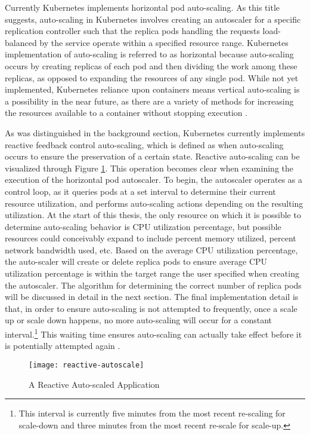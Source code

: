 Currently Kubernetes implements horizontal pod auto-scaling.
As this title suggests, auto-scaling in
Kubernetes involves creating an autoscaler for a specific replication
controller such that the replica pods handling the requests load-balanced by the service
operate within a specified resource range. Kubernetes
implementation of auto-scaling is referred to as horizontal because
auto-scaling occurs by creating replicas of each pod and then dividing the work
among these replicas, as opposed to expanding the resources of any single pod.
While not yet implemented, Kubernetes reliance upon containers means vertical
auto-scaling is a possibility in the near future, as there are a variety of
methods for increasing the resources available to a container without stopping
execution \cite{docker-up-and-running}.

As was distinguished in the background section, Kubernetes currently implements reactive
feedback control auto-scaling, which is defined as when auto-scaling occurs to
ensure the preservation of a certain state. Reactive auto-scaling can be
visualized through Figure \ref{fig:reactive-autoscale}.
This operation becomes clear when examining
the execution of the horizontal pod autoscaler. To begin, the autoscaler
operates as a control loop, as it queries pods at a set interval to determine
their current resource utilization, and performs auto-scaling actions depending on the
resulting utilization. At the start of this thesis, the only resource on which it is possible to
determine auto-scaling behavior is CPU utilization percentage, but possible
resources could conceivably expand to include percent memory utilized, percent
network bandwidth used, etc. Based on the average CPU utilization percentage, the
auto-scaler will create or delete replica pods to ensure average CPU utilization
percentage is within the target range the user specified when creating the
autoscaler. The algorithm for determining the correct number of replica pods
will be discussed in detail in the next section. The final implementation detail
is that, in order to ensure auto-scaling is not attempted to frequently, once a
scale up or scale down happens, no more auto-scaling will occur for a constant
interval.\footnote{This interval is currently five minutes from the most recent
re-scaling for scale-down and three minutes from the most recent re-scale for
scale-up.} This waiting time ensures auto-scaling can actually take effect
before it is potentially attempted again \cite{k8s-horizontal-pod-autoscaler-user-guide}.

\begin{figure}[!h]
  \centerline{\texttt{[image: reactive-autoscale]}}
  \caption{A Reactive Auto-scaled Application}
  \label{fig:reactive-autoscale}
\end{figure}
